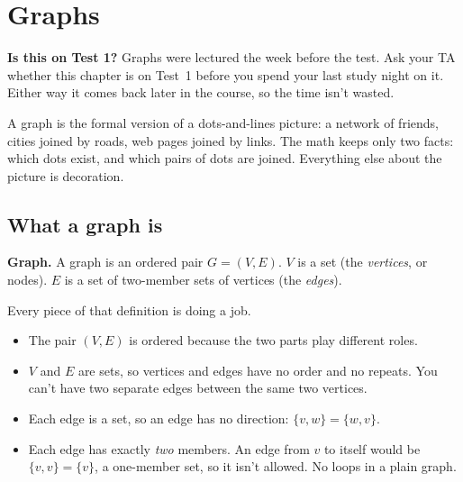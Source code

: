 \section{Graphs}

\newcommand{\grBase}{%
  \node[vert] (a) at (0,0) {$a$};
  \node[vert] (b) at (1.6,0) {$b$};
  \node[vert] (c) at (0.8,-1.1) {$c$};
  \node[vert] (d) at (0.8,-2.3) {$d$};
  \node[vert] (e) at (2.75,-0.55) {$e$};
  \node[vert] (f) at (2.75,-1.75) {$f$};
  \draw[gray] (a)--(b) (b)--(c) (c)--(a) (c)--(d) (e)--(f);}
\newcommand{\grStep}[3]{\node[font=\scriptsize,fill=white,inner sep=1pt] at ($(#1)!0.5!(#2)$) {#3};}

\begin{notebox}
\textbf{Is this on Test 1?} Graphs were lectured the week before the test. Ask your TA whether this chapter is on Test~1 before you spend your last study night on it. Either way it comes back later in the course, so the time isn't wasted.
\end{notebox}

A graph is the formal version of a dots-and-lines picture: a network of friends, cities joined by roads, web pages joined by links. The math keeps only two facts: which dots exist, and which pairs of dots are joined. Everything else about the picture is decoration.

\subsection{What a graph is}

\begin{notebox}
\textbf{Graph.} A graph is an ordered pair $G=(V,E)$. $V$ is a set (the \emph{vertices}, or nodes). $E$ is a set of two-member sets of vertices (the \emph{edges}).
\end{notebox}

Every piece of that definition is doing a job.
\begin{itemize}
\item The pair $(V,E)$ is ordered because the two parts play different roles.
\item $V$ and $E$ are sets, so vertices and edges have no order and no repeats. You can't have two separate edges between the same two vertices.
\item Each edge is a set, so an edge has no direction: $\{v,w\}=\{w,v\}$.
\item Each edge has exactly \emph{two} members. An edge from $v$ to itself would be $\{v,v\}=\{v\}$, a one-member set, so it isn't allowed. No loops in a plain graph.
\end{itemize}

